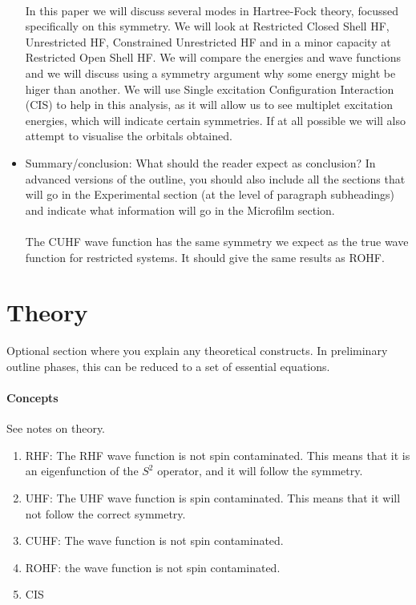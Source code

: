 \documentclass[twoside,twocolumn,9pt]{article}
\begin{document}
\begin{itemize}
    \paragraph*{}
    In this paper we will discuss several modes in Hartree-Fock theory, focussed specifically on this symmetry. We will look at Restricted Closed
Shell HF, Unrestricted HF, Constrained Unrestricted HF and in a minor capacity at Restricted Open Shell HF. We will compare the energies
and wave functions and we will discuss using a symmetry argument why some energy might be higer than another. We will use 
Single excitation Configuration Interaction (CIS) to help in this analysis, as it will allow us to see multiplet excitation energies, 
which will indicate certain symmetries. If at all possible we will also attempt to visualise the orbitals obtained. 
    \item Summary/conclusion: What should the reader expect as conclusion? In advanced versions of the outline, you should also include all the sections that will go in the Experimental section (at the level of paragraph subheadings) and indicate what information will go in the Microfilm section.
    \paragraph*{}
    The CUHF wave function has the same symmetry we expect as the true wave function for restricted systems. It should give the same results as ROHF.
\end{itemize}

\section{Theory}

Optional section where you explain any theoretical constructs. In preliminary outline phases, this can be reduced to a set of essential equations.
\paragraph*{Concepts}
See notes on theory.
\begin{enumerate}
  \item RHF: The RHF wave function is not spin contaminated. This means that it is an eigenfunction of the $S^2$ operator, and it will follow the symmetry.
  \item UHF: The UHF wave function is spin contaminated. This means that it will not follow the correct symmetry.
  \item CUHF: The wave function is not spin contaminated.
  \item ROHF: the wave function is not spin contaminated.
  \item CIS
\end{enumerate}
\end{document}
